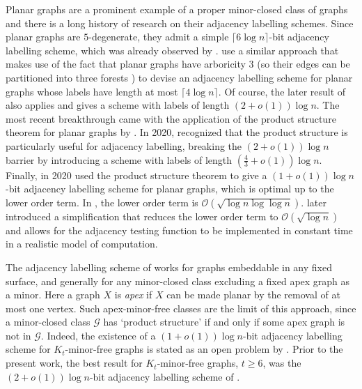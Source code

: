 \documentclass{patmorin}
\renewcommand{\geq}{\geqslant}
\newcommand{\vida}[1]{\noindent{\color{pink} VD: #1}}
\newcommand{\piotr}[1]{\noindent\textcolor{red}{PiMi: #1}}
\newcommand{\defin}[1]{\emph{\textcolor{brightmaroon}{#1}}}
\newcommand{\Oh}{\mathcal{O}}
\begin{document}
Planar graphs are a prominent example of a proper minor-closed class of graphs and there is a long history of research
on their adjacency labelling schemes.
Since planar graphs are $5$-degenerate,
they admit a simple $\lceil6\log n\rceil$-bit adjacency labelling scheme, which was already observed by \citet{muller:local}.
\citet{kannan.naor.ea:implicit} use a similar approach that makes use of the fact that planar graphs have arboricity 3 (so their edges can be partitioned into three forests \cite{nash-williams:edge-disjoint}) to devise an adjacency labelling scheme for planar graphs whose labels have length at most $\lceil4\log n\rceil$. %
 Of course, the later result of \citet{gavoille.labourel:shorter} also applies and gives a scheme with labels of length $(2+o(1))\log n$.
The most recent breakthrough came with the application of the product structure theorem for planar graphs by \citet{dujmovic.joret.ea:planar}.
In 2020, \citet{BGP22} recognized that the product structure is particularly useful for adjacency labelling, breaking the $(2+o(1))\log n$  barrier by introducing a scheme with labels of length $(\frac{4}{3}+o(1))\log n$.
Finally, in 2020 \citet{dujmovic.esperet.ea:adjacency} used the product structure theorem to give a $(1+o(1))\log n$-bit adjacency labelling scheme for planar graphs, which is optimal up to the lower order term. In \cite{dujmovic.esperet.ea:adjacency}, the lower order term is $\Oh(\sqrt{\log n\log\log n})$.  \citet{gawrychowski.janczewski:simpler} later introduced a simplification that reduces the lower order term to $\Oh(\sqrt{\log n})$ and allows for the adjacency testing function to be implemented in constant time in a realistic model of computation.

The adjacency labelling scheme of \citet{dujmovic.esperet.ea:adjacency} works for  graphs embeddable in any fixed surface, and generally for any minor-closed class excluding a fixed apex graph as a minor. Here a graph $X$ is \defin{apex} if $X$ can be made planar by the removal of at most one vertex.
Such apex-minor-free classes are the limit of this approach, since a minor-closed class $\mathcal{G}$ has `product structure' if and only if some apex graph is not in $\mathcal{G}$. Indeed, the existence of a $(1+o(1))\log n$-bit adjacency labelling scheme for $K_t$-minor-free graphs is stated as an open problem by \citet[Section~6, Problem~2]{dujmovic.esperet.ea:adjacency}. Prior to the present work, the best result for $K_t$-minor-free graphs, $t\geq 6$, was the $(2+o(1))\log n$-bit adjacency labelling scheme of \citet{gavoille.labourel:shorter}.
\end{document}
